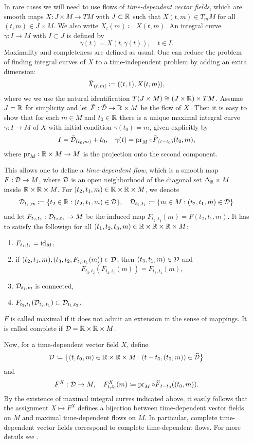 \begin{rem}
    In rare cases we will need to use flows of \emph{time-dependent vector fields}, which are smooth maps $X:J\times M\to TM$ with $J\subset\mathbb{R}$ such that $X(t,m)\in T_m M$ for all $(t,m)\in J\times M$. We also write $X_t(m)\coloneqq X(t,m)$. An integral curve $\gamma:I\to M$ with $I\subset J$ is defined by 
    \[\dot\gamma(t)=X(t,\gamma(t)),\quad t\in I.\]
    Maximality and completeness are defined as usual. One can reduce the problem of finding integral curves of $X$ to a time-independent problem by adding an extra dimension:
    \[\wt X_{(t,m)}\coloneqq ((t,1),X(t,m)),\]
    where we we use the natural identification $T(J\times M)\cong (J\times\mathbb{R})\times TM$. Assume $J=\mathbb{R}$ for simplicity and let $\wt F:\wt\calD\to \bbR\times M$ be the flow of $\wt X$. Then it is easy to show that for each $m\in M$ and $t_0\in\mathbb{R}$ there is a unique maximal integral curve $\gamma:I\to M$ of $X$ with initial condition $\gamma(t_0)=m$, given explicitly by 
    \[I=\wt{\calD}_{(t_0,m)}+t_0,\quad \gamma(t)=\pr_M\circ \wt{F}_{(t-t_0)}(t_0,m),\]
    where $\operatorname{pr}_M:\mathbb{R}\times M\to M$ is the projection onto the second component.
    
    This allows one to define a \emph{time-dependent flow}, which is a smooth map $F:\mathcal{D}\to M$, where $\mathcal{D}$ is an open neighborhood of the diagonal set $\Delta_{\mathbb{R}}\times M$ inside $\mathbb{R}\times\mathbb{R} \times M$.  For $(t_2,t_1,m)\in\mathbb{R}\times\mathbb{R}\times M$, we denote 
    \[\mathcal{D}_{t_1,m}\coloneqq \{t_2\in\mathbb{R}:(t_2,t_1,m)\in\mathcal{D}\},\quad \mathcal{D}_{t_2,t_1}\coloneqq \{m\in M:(t_2,t_1,m)\in\mathcal{D}\}\]
    and let $F_{t_2,t_1}:\mathcal{D}_{t_2,t_1}\to M$ be the induced map $F_{t_2,t_1}(m)=F(t_2,t_1,m)$. It has to satisfy the followign for all $(t_1,t_2,t_3,m)\in\mathbb{R}\times\mathbb{R}\times\mathbb{R}\times M$:
    \begin{enumerate}
        \item $F_{t_1,t_1}=\operatorname{id}_M$,
        \item if $(t_2,t_1,m),(t_3,t_2,F_{t_2,t_1}(m))\in\mathcal{D}$, then $(t_3,t_1,m)\in\mathcal{D}$ and 
        \[F_{t_3,t_2}(F_{t_2,t_1}(m))=F_{t_3,t_1}(m),\]
        \item $\mathcal{D}_{t_1,m}$ is connected,
        \item $F_{t_2,t_1}(\mathcal{D}_{t_2,t_1})\subset \mathcal{D}_{t_1,t_2}$.
    \end{enumerate}
    $F$ is called maximal if it does not admit an extension in the sense of mappings. It is called complete if $\mathcal{D}=\mathbb{R}\times\mathbb{R}\times M$. 
    
    Now, for a time-dependent vector field $X$, define 
    \[\calD\coloneqq \left\{(t,t_0,m)\in\bbR\times\bbR\times M:(t-t_0,(t_0,m))\in\wt\calD\right\}\]
    and 
    \[F^X:\calD\to M,\quad F^X_{t,t_0}(m)\coloneqq \pr_M\circ \wt{F}_{t-t_0}((t_0,m)).\]
    By the existence of maximal integral curves indicated above, it easily follows that the assignment $X\mapsto F^X$ defines a bijection between time-dependent vector fields on $M$ and maximal time-dependent flows on $M$. In particular, complete time-dependent vector fields correspond to complete time-dependent flows. For more details see \cite[Sec.~3.4]{RS1}.
\end{rem}
